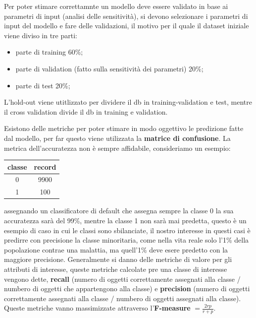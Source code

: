 \documentclass[12pt]{article}
\begin{document}
Per poter stimare correttamnte un modello deve essere validato in base ai parametri di input (analisi delle sensitivit\`a), si devono selezionare i parametri di input del modello e fare delle validazioni, il motivo per il quale il dataset iniziale viene diviso in tre parti:
\begin{itemize}
    \item parte di training 60\%;
    \item parte di validation (fatto sulla sensitivit\`a dei parametri) 20\%;
    \item parte di test 20\%;
\end{itemize}
L'hold-out viene utitlizzato per dividere il db in training-validation e test, mentre il cross validation divide il db in training e validation.

Esistono delle metriche per poter stimare in modo oggettivo le predizione fatte dal modello, per far questo viene utilizzata la \textbf{matrice di confusione}.
La metrica  dell'accuratezza non \`e sempre affidabile, consideriamo un esempio: 
\begin{table}[H]
    \centering
    \begin{tabular}{|c|c|}
        \hline
        classe & record \\
        \hline
        0 & 9900 \\
        1 & 100 \\
        \hline
    \end{tabular}
\end{table}
assegnando un classificatore di default che assegna sempre la classe 0 la sua accuratezza sar\`a del 99\%, mentre la classe 1 non sar\`a mai predetta, questo \`e un esempio di caso in cui le classi sono sbilanciate, il nostro interesse in questi casi \`e predirre con precisione la classe minoritaria, come nella vita reale solo l'1\% della popolazione contrae una malattia, ma quell'1\% deve esere predetto con la maggiore precisione. Generalmente si danno delle metriche di valore per gli attributi di interesse, queste metriche calcolate pre una classe di interesse vengono dette, \textbf{recall} (numero di oggetti correttamente assegnati alla classe / numbero di oggetti che appartengono alla classe) e \textbf{precision} (numero di oggetti correttamente assegnati alla classe / numbero di oggetti assegnati alla classe). Queste metriche vanno massimizzate attraverso l'\textbf{F-measure} $= \frac{2rp}{r + p} $.
\end{document}
